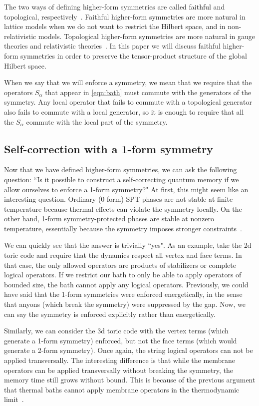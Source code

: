 The two ways of defining higher-form symmetries are called faithful and topological, respectively~\cite{Qi2021Exotic}. Faithful higher-form symmetries are more natural in lattice models when we do not want to restrict the Hilbert space, and in non-relativistic models. Topological higher-form symmetries are more natural in gauge theories and relativistic theories~\cite{Seiberg2020Field}.  In this paper we will discuss faithful higher-form symmetries in order to preserve the tensor-product structure of the global Hilbert space.

When we say that we will enforce a symmetry, we mean that we require that the operators $S_\alpha$ that appear in \eqref{eqn:bath} must commute with the generators of the symmetry. Any local operator that fails to commute with a topological generator also fails to commute with a local generator, so it is enough to require that all the $S_\alpha$ commute with the local part of the symmetry. 

\subsection{Self-correction with a 1-form symmetry} \label{sub:RB}

Now that we have defined higher-form symmetries, we can ask the following question: ``Is it possible to construct a self-correcting quantum memory if we allow ourselves to enforce a 1-form symmetry?" At first, this might seem like an interesting question. Ordinary (0-form) SPT phases are not stable at finite temperature because thermal effects can violate the symmetry locally. On the other hand,
1-form symmetry-protected phases are stable at nonzero temperature, essentially because the symmetry imposes stronger constraints~\cite{Roberts2017SPTO}. 

We can quickly see that the answer is trivially ``yes". As an example, take the 2d toric code and require that the dynamics respect all vertex and face terms. In that case, the only allowed operators are products of stabilizers or complete logical operators. If we restrict our bath to only be able to apply operators of bounded size, the bath cannot apply any logical operators. Previously, we could have said that the 1-form symmetries were enforced energetically, in the sense that anyons (which break the symmetry) were suppressed by the gap. Now, we can say the symmetry is enforced explicitly rather than energetically.

Similarly, we can consider the 3d toric code with the vertex terms (which generate a 1-form symmetry) enforced, but not the face terms (which would generate a 2-form symmetry). Once again, the string logical operators can not be applied transversally. The interesting difference is that while the membrane operators can be applied transversally without breaking the symmetry, the memory time still grows without bound. This is because of the previous argument that thermal baths cannot apply membrane operators in the thermodynamic limit~\cite{Dennis2002Topological, CastelnovoChamon2008}.

